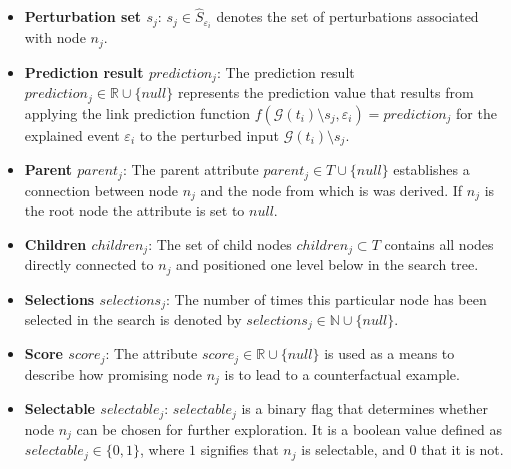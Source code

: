 \begin{itemize}
    \item \textbf{Perturbation set $s_j$}: $s_j \in \hat{S}_{\varepsilon_i}$ denotes the set of perturbations associated with node $n_j$.

    \item \textbf{Prediction result $prediction_j$}: The prediction result $prediction_j \in \mathbb{R} \cup \{null\}$ represents the prediction value that results from applying the link prediction function $f(\mathcal{G}(t_i) \setminus s_j, \varepsilon_i) = prediction_j$ for the explained event $\varepsilon_i$ to the perturbed input $\mathcal{G}(t_i) \setminus s_j$.

    \item \textbf{Parent $parent_j$}: The parent attribute $parent_j \in T \cup \{null\}$ establishes a connection between node $n_j$ and the node from which is was derived. If $n_j$ is the root node the attribute is set to $null$.

    \item \textbf{Children $children_j$}: The set of child nodes $children_j \subset T$ contains all nodes directly connected to $n_j$ and positioned one level below in the search tree.

    \item \textbf{Selections $selections_j$}: The number of times this particular node has been selected in the search is denoted by $selections_j \in \mathbb{N} \cup \{null\}$.

    \item \textbf{Score $score_j$}: The attribute $score_j \in \mathbb{R} \cup \{null\}$ is used as a means to describe how promising node $n_j$ is to lead to a counterfactual example.

    \item \textbf{Selectable $selectable_j$}: $selectable_j$ is a binary flag that determines whether node $n_j$ can be chosen for further exploration. It is a boolean value defined as $selectable_j \in \{0, 1\}$, where $1$ signifies that $n_j$ is selectable, and $0$ that it is not.
\end{itemize}

